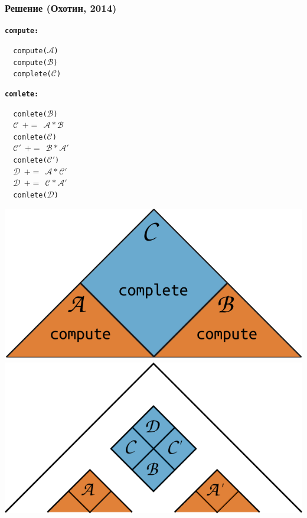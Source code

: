 \documentclass[28pt,pdf,hyperref={unicode}]{beamer}
\renewcommand{\emph}[1]{\textbf{\color{memph}#1}}
\begin{document}
\begin{frame}
\frametitle{Решение (Охотин, 2014)}

\emph{\texttt{compute:}}

\texttt{
  \ compute($\mathcal{A}$)\\
  \ \ compute($\mathcal{B}$)\\
  \ \ complete($\mathcal{C}$)\\
}
\vskip20pt

\emph{\texttt{comlete:}}

\texttt{
  \ comlete($\mathcal{B}$)\\
  \ \ $\mathcal{C}\ \ +=\ \ \mathcal{A}\ast\mathcal{B}$\\
  \ \ comlete($\mathcal{C}$)\\
  \ \ $\mathcal{C'}\ \ +=\ \ \mathcal{B}\ast\mathcal{A'}$\\
  \ \ comlete($\mathcal{C'}$)\\
  \ \ $\mathcal{D}\ \ +=\ \ \mathcal{A}\ast\mathcal{C'}$\\
  \ \ $\mathcal{D}\ \ +=\ \ \mathcal{C}\ast\mathcal{A'}$\\
  \ \ comlete($\mathcal{D}$)
}

\begin{center}
\vskip-215pt
\hfill
\includegraphics[width=.55\textwidth]{pics/drawing2.png}
\vskip25pt
\hfill
\includegraphics[width=.55\textwidth]{pics/drawing3.png}
\end{center}
\end{frame}
\end{document}
